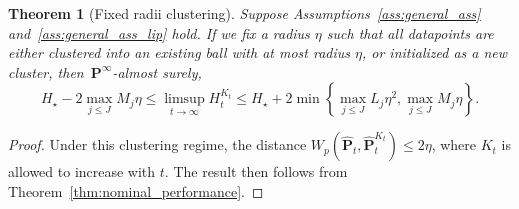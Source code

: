 \documentclass[12pt]{article}
\newcommand{\ie}{{\it i.e.}}
\newcommand{\prob}{{\mathbf P}}
\newtheorem{theorem}{Theorem}[section]  %
\begin{document}
\begin{theorem}[Fixed radii clustering] 
Suppose Assumptions~\ref{ass:general_ass} and~\ref{ass:general_ass_lip} hold. If we fix a radius $\eta$ such that 
all datapoints are either clustered into an existing ball with at most radius $\eta$, or initialized as a new cluster, then~$\prob^\infty$-almost surely,
$$  H_\star - 2\max_{j\leq J}M_j\eta \leq \limsup_{t \rightarrow \infty } H^{K_t}_t \leq H_\star + 2\min\left\{ {\max_{j \leq J}L_j}\eta^2, \max_{j\leq J}M_j\eta\right\}.$$
\end{theorem}
\begin{proof}
 Under this clustering regime, the distance $W_p(\hat{\prob}_t,\hat{\prob}^{K_t}_t) \leq 2\eta$, where $K_t$ is allowed to increase with $t$. The result then follows from Theorem~\ref{thm:nominal_performance}.
\end{proof}
\fi
\end{document}
